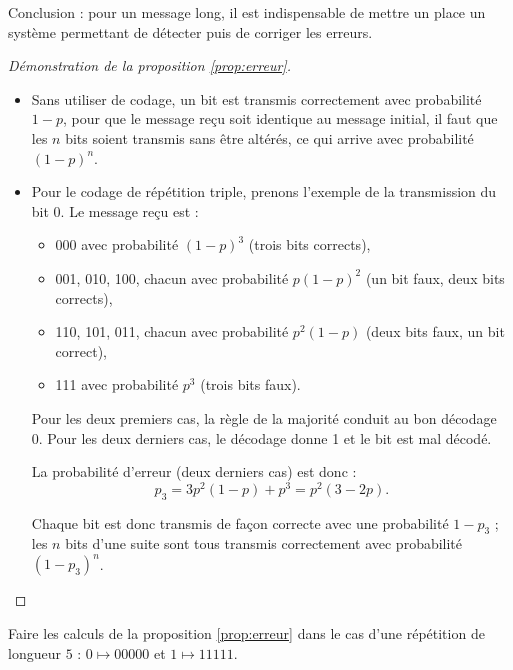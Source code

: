 \documentclass[11pt,class=report,crop=false]{standalone}
\begin{document}
Conclusion : pour un message long, il est indispensable de mettre un place un système permettant de détecter puis de corriger les erreurs.


\begin{proof}[Démonstration de la proposition \ref{prop:erreur}]
~

\begin{itemize}
  \item Sans utiliser de codage, un bit est transmis correctement avec probabilité $1-p$, pour que le message reçu soit identique au message initial, il faut que les $n$ bits soient transmis sans être altérés, ce qui arrive avec probabilité $(1-p)^n$.

  \item Pour le codage de répétition triple, prenons l'exemple de la transmission du bit \og{}0\fg{}. Le message reçu est :
  \begin{itemize}
    \item \og{}000\fg{} avec probabilité $(1-p)^3$ (trois bits corrects),
    \item \og{}001\fg{}, \og{}010\fg{}, \og{}100\fg{}, chacun avec probabilité $p(1-p)^2$ (un bit faux, deux bits corrects),
    \item \og{}110\fg{}, \og{}101\fg{}, \og{}011\fg{}, chacun avec probabilité $p^2(1-p)$ (deux bits faux, un bit correct),
    \item \og{}111\fg{} avec probabilité $p^3$ (trois bits faux).
  \end{itemize}
  Pour les deux premiers cas, la règle de la majorité conduit au bon décodage \og{}0\fg{}.
  Pour les deux derniers cas, le décodage donne \og{}1\fg{} et le bit est mal décodé.

  La probabilité d'erreur (deux derniers cas) est donc :
  $$p_3 = 3p^2(1-p) + p^3 = p^2(3-2p).$$

  Chaque bit est donc transmis de façon correcte avec une probabilité $1-p_3$ ; les  $n$ bits d'une suite sont tous transmis correctement avec probabilité $(1-p_ 3)^n$.

\end{itemize}
\end{proof}

\begin{exercicecours}
Faire les calculs de la proposition \ref{prop:erreur} dans le cas d'une répétition de longueur $5$ :
$0 \mapsto 00000$ et $1 \mapsto 11111$.
\end{exercicecours}
\end{document}
